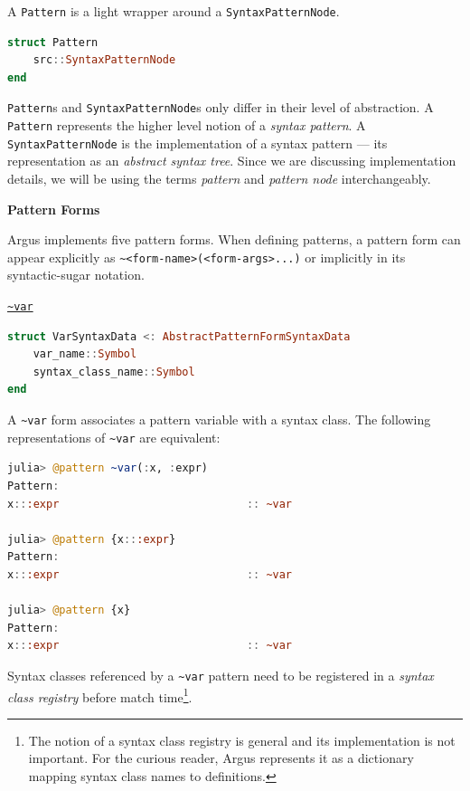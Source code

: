 \documentclass{juliacon}
\begin{document}
A \texttt{Pattern} is a light wrapper around a \texttt{SyntaxPatternNode}.

\begin{lstlisting}[language=Julia]
struct Pattern
    src::SyntaxPatternNode
end
\end{lstlisting}

\texttt{Pattern}s and \texttt{SyntaxPatternNode}s only differ in their level of
abstraction. A \texttt{Pattern} represents the higher level notion of a
\emph{syntax pattern}. A \texttt{SyntaxPatternNode} is the implementation of a
syntax pattern — its representation as an \emph{abstract syntax
tree}. Since we are discussing implementation details, we will be
using the terms \emph{pattern} and \emph{pattern node} interchangeably.

\label{orga8b3c0d}\vspace{0.5cm}
\textbf{Pattern Forms}\vspace{0.2cm}

Argus implements five pattern forms. When defining patterns, a pattern
form can appear explicitly as \texttt{\textasciitilde{}<form-name>(<form-args>...)} or
implicitly in its syntactic-sugar notation.

\vspace{0.2cm}
\label{org831c838}\vspace{0.2cm}
\underline{\texttt{\textasciitilde{}var}}

\begin{lstlisting}[language=Julia]
struct VarSyntaxData <: AbstractPatternFormSyntaxData
    var_name::Symbol
    syntax_class_name::Symbol
end
\end{lstlisting}

A \texttt{\textasciitilde{}var} form associates a pattern variable with a syntax class. The
following representations of \texttt{\textasciitilde{}var} are equivalent:

\begin{lstlisting}[language=Julia]
julia> @pattern ~var(:x, :expr)
Pattern:
x:::expr                             :: ~var

julia> @pattern {x:::expr}
Pattern:
x:::expr                             :: ~var

julia> @pattern {x}
Pattern:
x:::expr                             :: ~var
\end{lstlisting}

Syntax classes referenced by a \texttt{\textasciitilde{}var} pattern need to be registered in
a \emph{syntax class registry} before match time\footnote{The notion of a syntax class registry is general and its
implementation is not important. For the curious reader, Argus
represents it as a dictionary mapping syntax class names to
definitions.}.
\end{document}
